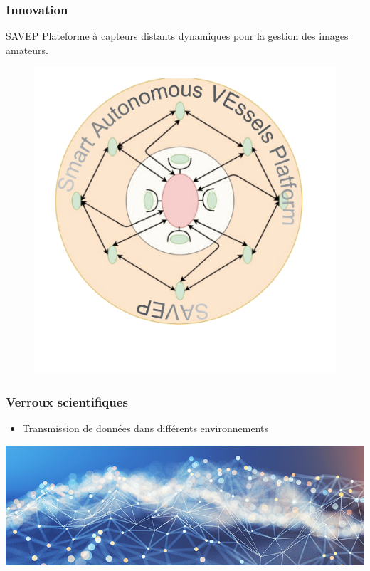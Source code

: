 \begin{frame}
	\frametitle{Innovation}
	\begin{block}{\large SAVEP}
		\large Plateforme à \color{red}capteurs distants dynamiques \color{black} pour la gestion des \color{red}images amateurs\color{black}.
	\end{block}
	\begin{figure}			
				\includegraphics[scale=0.3]{images/SAVEP/logoSAVEP.png}\\
	\end{figure}
\end{frame}

\begin{frame}
	\frametitle{Verroux scientifiques}
	\vspace{-0.9cm}
	\begin{itemize} 
	\Large \item [\ding{43}] Transmission de données dans différents environnements\\
	\end{itemize}
	\vspace{0.5cm}
	\centering
	\includegraphics[scale=0.4]{Files/fig/excellence-numerique.jpeg}
\end{frame}

